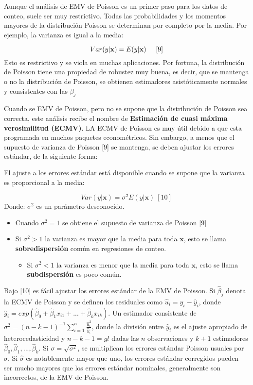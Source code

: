 \documentclass[
  letterpaper,
  DIV=11,
  numbers=noendperiod]{scrreprt}
\providecommand{\tightlist}{%
  \setlength{\itemsep}{0pt}\setlength{\parskip}{0pt}}\usepackage{longtable,booktabs,array}
\begin{document}
Aunque el análisis de EMV de Poisson es un primer paso para los datos de
conteo, suele ser muy restrictivo. Todas las probabilidades y los
momentos mayores de la distribución Poisson se determinan por completo
por la media. Por ejemplo, la varianza es igual a la media:

\[Var(y|\mathbf{x})=E(y|\mathbf{x})\hspace{0.5cm} [9]\] Esto es
restrictivo y se viola en muchas aplicaciones. Por fortuna, la
distribución de Poisson tiene una propiedad de robustez muy buena, es
decir, que se mantenga o no la distribución de Poisson, se obtienen
estimadores asistóticamente normales y consistentes con las \(\beta_j\)

Cuando se EMV de Poisson, pero no se supone que la distribución de
Poisson sea correcta, este análisis recibe el nombre de
\textbf{Estimación de cuasi máxima verosimilitud (ECMV)}. LA ECMV de
Poisson es muy útil debido a que esta programada en muchos paquetes
econométricos. Sin embargo, a menos que el supuesto de varianza de
Poisson {[}9{]} se mantenga, se deben ajustar los errores estándar, de
la siguiente forma:

El ajuste a los errores estándar está disponible cuando se supone que la
varianza es proporcional a la media:

\[Var(y|\mathbf{x})=\sigma^2E(y|\mathbf{x})\ [10]\] Donde: \(\sigma^2\)
es un parámetro desconocido.

\begin{itemize}
\item
  Cuando \(\sigma^2=1\) se obtiene el supuesto de varianza de Poisson
  {[}9{]}
\item
  Si \(\sigma^2>1\) la varianza es mayor que la media para toda
  \(\mathbf{x}\), esto se llama \textbf{sobredispersión} común en
  regresiones de conteo.

  \begin{itemize}
  \tightlist
  \item
    Si \(\sigma^2<1\) la varianza es menor que la media para toda
    \(\mathbf{x}\), esto se llama \textbf{subdispersión} es poco común.
  \end{itemize}
\end{itemize}

Bajo {[}10{]} es fácil ajustar los errores estándar de la EMV de
Poisson. Si \(\hat{\beta}_j\) denota la ECMV de Poisson y se definen los
residuales como \(\hat{u}_i=y_i-\hat{y}_i\), donde
\(\hat{y}_i=exp(\hat{\beta}_0+\hat{\beta}_1x_{i1}+...+\hat{\beta}_kx_{ik})\).
Un estimador consistente de
\(\sigma^2=(n-k-1)^{-1}\sum_{i=1}^n\frac{\hat{u}_i^2}{\hat{y}_i}\),
donde la división entre \(\hat{y}_i\) es el ajuste apropiado de
heterocedasticidad y \(n-k-1=gl\) dadas las \(n\) observaciones y
\(k+1\) estimadores \(\hat{\beta}_0,\hat{\beta}_1,...,\hat{\beta}_k\).
Si \(\sigma=\sqrt{\sigma^2}\), se multiplican los errores estándar
Poisson usuales por \(\hat{\sigma}\). Si \(\hat{\sigma}\) es
notablemente mayor que uno, los errores estándar corregidos pueden ser
mucho mayores que los errores estándar nominales, generalmente son
incorrectos, de la EMV de Poisson.
\end{document}
